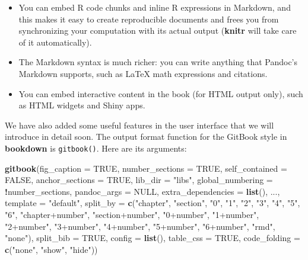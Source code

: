 \documentclass[
  12pt,
]{krantz}
\newenvironment{Shaded}{\begin{snugshade}}{\end{snugshade}}
\newcommand{\AttributeTok}[1]{\textcolor[rgb]{0.13,0.29,0.53}{#1}}
\newcommand{\ConstantTok}[1]{\textcolor[rgb]{0.56,0.35,0.01}{#1}}
\newcommand{\FunctionTok}[1]{\textcolor[rgb]{0.13,0.29,0.53}{\textbf{#1}}}
\newcommand{\NormalTok}[1]{#1}
\newcommand{\SpecialCharTok}[1]{\textcolor[rgb]{0.81,0.36,0.00}{\textbf{#1}}}
\newcommand{\StringTok}[1]{\textcolor[rgb]{0.31,0.60,0.02}{#1}}
\newcounter{none} %
\providecommand{\tightlist}{%
  \setlength{\itemsep}{0pt}\setlength{\parskip}{0pt}}
\theoremstyle{definition}
\theoremstyle{definition}
\theoremstyle{definition}
\theoremstyle{definition}
\theoremstyle{remark}
\begin{document}
\begin{itemize}
\tightlist
\item
  You can embed R code chunks and inline R expressions in Markdown, and this makes it easy to create reproducible documents and frees you from synchronizing your computation with its actual output (\textbf{knitr} will take care of it automatically).
\item
  The Markdown syntax is much richer: you can write anything that Pandoc's Markdown supports, such as LaTeX math expressions and citations.
\item
  You can embed interactive content in the book (for HTML output only), such as HTML widgets and Shiny apps.
\end{itemize}

We have also added some useful features in the user interface that we will introduce in detail soon. The output format function for the GitBook style in \textbf{bookdown} is \texttt{gitbook()}. Here are its arguments:

\begin{Shaded}
\begin{Highlighting}[]
\FunctionTok{gitbook}\NormalTok{(}\AttributeTok{fig\_caption =} \ConstantTok{TRUE}\NormalTok{, }\AttributeTok{number\_sections =} \ConstantTok{TRUE}\NormalTok{,}
  \AttributeTok{self\_contained =} \ConstantTok{FALSE}\NormalTok{, }\AttributeTok{anchor\_sections =} \ConstantTok{TRUE}\NormalTok{,}
  \AttributeTok{lib\_dir =} \StringTok{"libs"}\NormalTok{, }\AttributeTok{global\_numbering =} \SpecialCharTok{!}\NormalTok{number\_sections,}
  \AttributeTok{pandoc\_args =} \ConstantTok{NULL}\NormalTok{, }\AttributeTok{extra\_dependencies =} \FunctionTok{list}\NormalTok{(),}
\NormalTok{  ..., }\AttributeTok{template =} \StringTok{"default"}\NormalTok{, }\AttributeTok{split\_by =} \FunctionTok{c}\NormalTok{(}\StringTok{"chapter"}\NormalTok{,}
    \StringTok{"section"}\NormalTok{, }\StringTok{"0"}\NormalTok{, }\StringTok{"1"}\NormalTok{, }\StringTok{"2"}\NormalTok{, }\StringTok{"3"}\NormalTok{, }\StringTok{"4"}\NormalTok{, }\StringTok{"5"}\NormalTok{, }\StringTok{"6"}\NormalTok{,}
    \StringTok{"chapter+number"}\NormalTok{, }\StringTok{"section+number"}\NormalTok{, }\StringTok{"0+number"}\NormalTok{,}
    \StringTok{"1+number"}\NormalTok{, }\StringTok{"2+number"}\NormalTok{, }\StringTok{"3+number"}\NormalTok{, }\StringTok{"4+number"}\NormalTok{,}
    \StringTok{"5+number"}\NormalTok{, }\StringTok{"6+number"}\NormalTok{, }\StringTok{"rmd"}\NormalTok{, }\StringTok{"none"}\NormalTok{), }\AttributeTok{split\_bib =} \ConstantTok{TRUE}\NormalTok{,}
  \AttributeTok{config =} \FunctionTok{list}\NormalTok{(), }\AttributeTok{table\_css =} \ConstantTok{TRUE}\NormalTok{, }\AttributeTok{code\_folding =} \FunctionTok{c}\NormalTok{(}\StringTok{"none"}\NormalTok{,}
    \StringTok{"show"}\NormalTok{, }\StringTok{"hide"}\NormalTok{))}
\end{Highlighting}
\end{Shaded}
\end{document}
